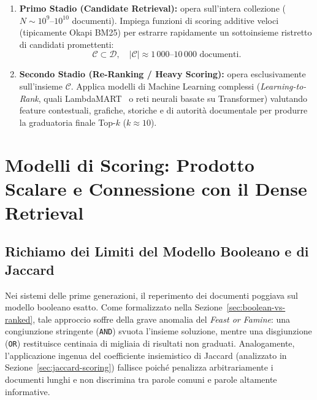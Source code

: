 \begin{enumerate}
    \item \textbf{Primo Stadio (Candidate Retrieval):} opera sull'intera collezione ($N \sim 10^9\text{--}10^{10}$ documenti). Impiega funzioni di scoring additive veloci (tipicamente Okapi BM25) per estrarre rapidamente un sottoinsieme ristretto di candidati promettenti:
    \begin{equation}
    \mathcal{C} \subset \mathcal{D}, \quad |\mathcal{C}| \approx 1\,000 \text{--} 10\,000 \text{ documenti}.
    \end{equation}
    \item \textbf{Secondo Stadio (Re-Ranking / Heavy Scoring):} opera esclusivamente sull'insieme $\mathcal{C}$. Applica modelli di Machine Learning complessi (\textit{Learning-to-Rank}, quali LambdaMART~\cite{burges2010} o reti neurali basate su Transformer) valutando feature contestuali, grafiche, storiche e di autorit\`a documentale per produrre la graduatoria finale Top-$k$ ($k \approx 10$).
\end{enumerate}

\FloatBarrier
\section{Modelli di Scoring: Prodotto Scalare e Connessione con il Dense Retrieval}
\label{sec:scoring-dotproduct-ponte}

\subsection{Richiamo dei Limiti del Modello Booleano e di Jaccard}
Nei sistemi delle prime generazioni, il reperimento dei documenti poggiava sul modello booleano esatto. Come formalizzato nella Sezione~\ref{sec:boolean-vs-ranked}, tale approccio soffre della grave anomalia del \textit{Feast or Famine}: una congiunzione stringente (\texttt{AND}) svuota l'insieme soluzione, mentre una disgiunzione (\texttt{OR}) restituisce centinaia di migliaia di risultati non graduati. Analogamente, l'applicazione ingenua del coefficiente insiemistico di Jaccard (analizzato in Sezione~\ref{sec:jaccard-scoring}) fallisce poich\'e penalizza arbitrariamente i documenti lunghi e non discrimina tra parole comuni e parole altamente informative.

